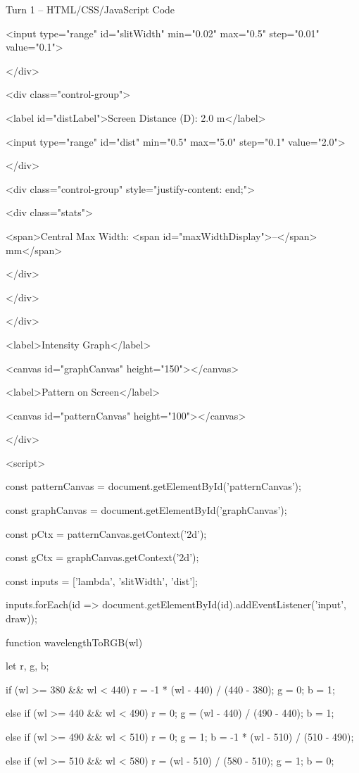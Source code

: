 \documentclass[10pt,a4paper]{article}
\begin{document}
\begin{htmlcodebox}{Turn 1 -- HTML/CSS/JavaScript Code}
{{            <input type="range" id="slitWidth" min="0.02" max="0.5" step="0.01" value="0.1">

        </div>

        <div class="control-group">

            <label id="distLabel">Screen Distance (D): 2.0 m</label>

            <input type="range" id="dist" min="0.5" max="5.0" step="0.1" value="2.0">

        </div>

        <div class="control-group" style="justify-content: end;">

            <div class="stats">

                <span>Central Max Width: <span id="maxWidthDisplay">--</span> mm</span>

            </div>

        </div>

    </div>

    <label>Intensity Graph</label>

    <canvas id="graphCanvas" height="150"></canvas>

    <label>Pattern on Screen</label>

    <canvas id="patternCanvas" height="100"></canvas>

</div>

<script>

const patternCanvas = document.getElementById('patternCanvas');

const graphCanvas = document.getElementById('graphCanvas');

const pCtx = patternCanvas.getContext('2d');

const gCtx = graphCanvas.getContext('2d');

const inputs = ['lambda', 'slitWidth', 'dist'];

inputs.forEach(id => document.getElementById(id).addEventListener('input', draw));

function wavelengthToRGB(wl) {

    let r, g, b;

    if (wl >= 380 && wl < 440) { r = -1 * (wl - 440) / (440 - 380); g = 0; b = 1; }

    else if (wl >= 440 && wl < 490) { r = 0; g = (wl - 440) / (490 - 440); b = 1; }

    else if (wl >= 490 && wl < 510) { r = 0; g = 1; b = -1 * (wl - 510) / (510 - 490); }

    else if (wl >= 510 && wl < 580) { r = (wl - 510) / (580 - 510); g = 1; b = 0; }

}}}
\end{htmlcodebox}
\end{document}
